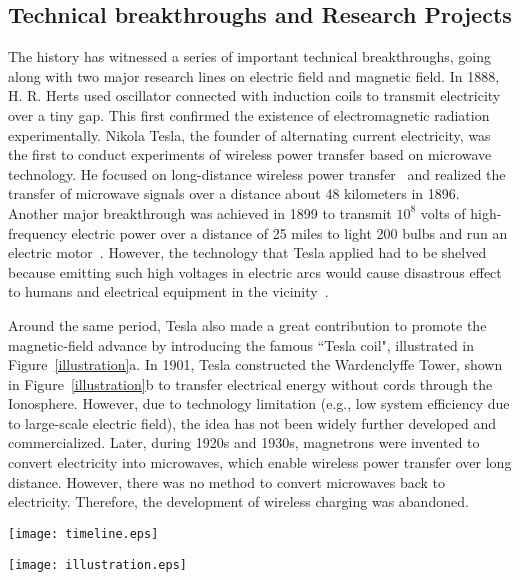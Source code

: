 \documentclass[twocolumn,10pt]{IEEEtran}
\begin{document}
\subsection{Technical breakthroughs and Research Projects}
The history has witnessed a series of important technical breakthroughs, going along with two major research lines on electric field and magnetic field. In 1888, H. R. Herts used oscillator connected with induction coils to transmit electricity over a tiny gap. This first confirmed the existence of electromagnetic radiation experimentally. Nikola Tesla, the founder of alternating current electricity, was the first to conduct experiments of wireless power transfer based on microwave technology. He focused on long-distance wireless power transfer~\cite{N.1914Tesla} and realized the transfer of microwave signals over a distance about 48 kilometers in 1896. Another major breakthrough was achieved in 1899 to transmit $10^8$ volts of high-frequency electric power over a distance of 25 miles to light 200 bulbs and run an electric motor~\cite{N.1914Tesla}. However, the technology that Tesla applied had to be shelved because emitting such high voltages in electric arcs would cause disastrous effect to humans and electrical equipment in the vicinity~\cite{R.2009Bhutkar}. 

Around the same period, Tesla also made a great contribution to promote the magnetic-field advance by introducing the famous ``Tesla coil", illustrated in Figure~\ref{illustration}a. In 1901, Tesla constructed the Wardenclyffe Tower, shown in Figure~\ref{illustration}b to transfer electrical energy without cords through the Ionosphere. However, due to technology limitation (e.g., low system efficiency due to large-scale electric field), the idea has not been widely further developed and commercialized. Later, during 1920s and 1930s, magnetrons were invented to convert electricity into microwaves, which enable wireless power transfer over long distance. However, there was no method to convert microwaves back to electricity. Therefore, the development of wireless charging was abandoned.  


\begin{figure*} 
\centering
\texttt{[image: timeline.eps]}
\caption{A brief development history of wireless power transmission.} \label{timeline}
\end{figure*}
 

\begin{figure*}
\centering
\texttt{[image: illustration.eps]}
\caption{Illustrations of wireless power transmission systems. a) Tesla coil~\cite{teslauniverse},  b) Wardenclyffe Tower~\cite{M.1981Cheney}, c) Microwave-powered airplane~\cite{airplanesandrockets}, d) JPL’s Goldstone Facility~\cite{jpl}, e) Witricity system~\cite{topnews}, f) Powercaster transmitter and harvester~\cite{Powercast}, g) Qi charging pads~\cite{Energizer,zens,bitmore}, h) Magnetic MIMO system~\cite{J.2014Jadidian}. (IEEE Copyright)} \label{illustration}
\end{figure*} 
\end{document}
